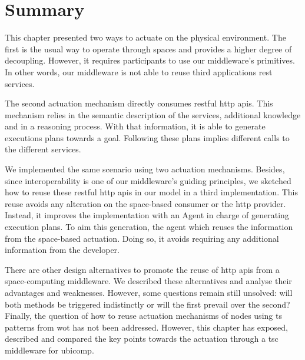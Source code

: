 \section{Summary}
\label{sec:actuation_summary}

This chapter presented two ways to actuate on the physical environment.
The first is the usual way to operate through spaces and provides a higher degree of decoupling.
However, it requires participants to use our middleware's primitives. %
In other words, our middleware is not able to reuse third applications \ac{rest} services.


The second actuation mechanism directly consumes \ac{rest}ful \acs{http} \acsp{api}.
This mechanism relies in the semantic description of the services, additional knowledge and in a reasoning process. %
With that information, it is able to generate executions plans towards a goal.
Following these plans implies different calls to the different services.


We implemented the same scenario using two actuation mechanisms.
Besides, since interoperability is one of our middleware's guiding principles, we sketched how to reuse these \ac{rest}ful \acs{http} \acsp{api} in our \Space{} model in a third implementation.
This reuse avoids any alteration on the space-based consumer or the \ac{http} provider.
Instead, it improves the \Space{} implementation with an Agent in charge of generating execution plans.
To aim this generation, the agent which reuses the information from the space-based actuation.
Doing so, it avoids requiring any additional information from the developer.


There are other design alternatives to promote the reuse of \acs{http} \acsp{api} from a space-computing middleware.
We described these alternatives and analyse their advantages and weaknesses.
However, some questions remain still unsolved: will both methods be triggered indistinctly or will the first prevail over the second?
Finally, the question of how to reuse actuation mechanisms of nodes using \ac{ts} patterns from \ac{wot} has not been addressed.
However, this chapter has exposed, described and compared the key points towards the actuation through a \ac{tsc} middleware for \ac{ubicomp}.